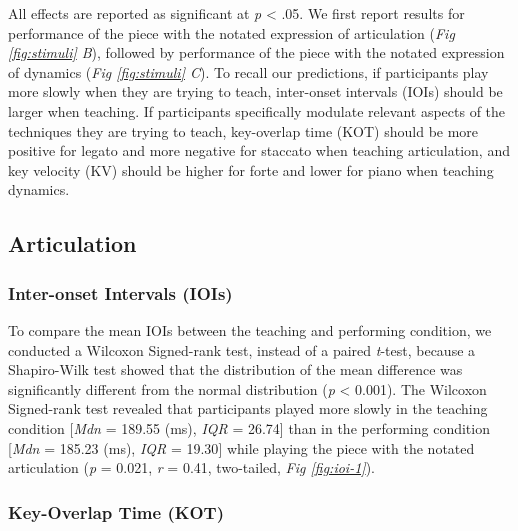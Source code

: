 \documentclass[
  man,floatsintext]{apa6}
\begin{document}
All effects are reported as significant at \emph{p} \textless{} .05. We first report results for performance of the piece with the notated expression of articulation (\emph{Fig \ref{fig:stimuli} B}), followed by performance of the piece with the notated expression of dynamics (\emph{Fig \ref{fig:stimuli} C}). To recall our predictions, if participants play more slowly when they are trying to teach, inter-onset intervals (IOIs) should be larger when teaching. If participants specifically modulate relevant aspects of the techniques they are trying to teach, key-overlap time (KOT) should be more positive for legato and more negative for staccato when teaching articulation, and key velocity (KV) should be higher for forte and lower for piano when teaching dynamics.

\hypertarget{articulation}{%
\subsection{Articulation}\label{articulation}}

\hypertarget{inter-onset-intervals-iois}{%
\subsubsection{Inter-onset Intervals (IOIs)}\label{inter-onset-intervals-iois}}

To compare the mean IOIs between the teaching and performing condition, we conducted a Wilcoxon Signed-rank test, instead of a paired \emph{t}-test, because a Shapiro-Wilk test showed that the distribution of the mean difference was significantly different from the normal distribution (\emph{p} \textless{} 0.001). The Wilcoxon Signed-rank test revealed that participants played more slowly in the teaching condition {[}\emph{Mdn} = 189.55 (ms), \emph{IQR} = 26.74{]} than in the performing condition {[}\emph{Mdn} = 185.23 (ms), \emph{IQR} = 19.30{]} while playing the piece with the notated articulation (\emph{p} = 0.021, \emph{r} = 0.41, two-tailed, \emph{Fig \ref{fig:ioi-1}}).

\hypertarget{key-overlap-time-kot}{%
\subsubsection{Key-Overlap Time (KOT)}\label{key-overlap-time-kot}}
\end{document}
